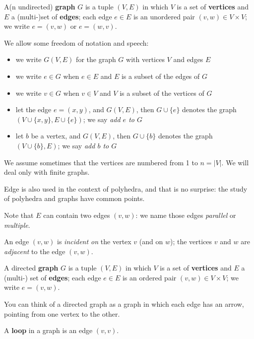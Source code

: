 \begin{definition}[Graph]
A(n undirected) \textbf{graph} $G$ is a tuple $(V,E)$ in which
$V$ is a set of \textbf{vertices} and $E$ a (multi-)set
of \textbf{edges}; each edge $e \in E$ is an unordered pair $(v,w) \in
V \times V$; we write $e = (v,w)$ or $e = (w,v)$.
\end{definition}

We allow some freedom of notation and speech:
\begin{itemize}
\item
we write $G(V,E)$ for the graph $G$ with vertices $V$ and edges $E$
\item
we write $e \in G$ when $e \in E$ and $E$ is a subset of the edges of $G$
\item
we write $v \in G$ when $v \in V$ and $V$ is a subset of the vertices of $G$
\item
let the edge $e = (x,y)$, and $G(V,E)$, then $G \cup \{e\}$ denotes
the graph $(V \cup \{x,y\},E \cup \{e\})$; we say {\em add $e$ to $G$}
\item
let $b$ be a vertex, and $G(V,E)$, then $G \cup \{b\}$ denotes the
graph $(V \cup \{b\},E )$; we say {\em add $b$ to $G$}
\end{itemize}

We assume sometimes that the vertices are numbered from 1 to $n =
|V|$. We will deal only with finite graphs.

Edge is also used in the context of polyhedra, and that is no
surprise: the study of polyhedra and graphs have common points.

Note that $E$ can contain two edges $(v,w)$: we name those edges {\em
parallel} or \emph{multiple}.

An edge $(v,w)$ is {\em incident on} the vertex $v$ (and on $w$);
the vertices $v$ and $w$ are {\em adjacent} to the edge $(v,w)$.

\begin{definition}
A directed \textbf{graph} $G$ is a tuple $(V,E)$ in which
$V$ is a set of \textbf{vertices} and $E$ a (multi-) set
of \textbf{edges}; each edge $e \in E$ is an ordered pair $(v,w) \in
V \times V$; we write $e = (v,w)$.
\end{definition}

You can think of a directed graph as a graph in which each edge has an
arrow, pointing from one vertex to the other.


\begin{definition}[Loop]
  \textup{A \textbf{loop} in a graph is an edge $(v,v)$. }
\end{definition}


